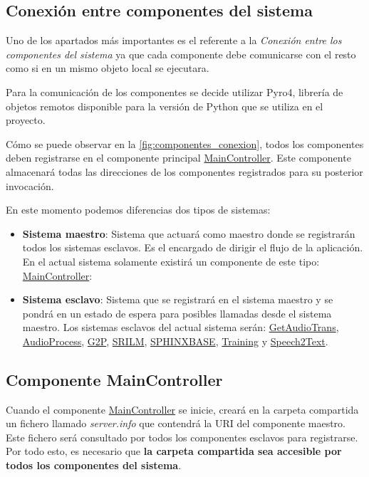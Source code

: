 \documentclass[../main.tex]{subfiles}
\begin{document}
\subsection{Conexión entre componentes del sistema}\label{subsec:impl_conexion}
Uno de los apartados más importantes es el referente a la \textit{Conexión entre los componentes del sistema} ya que cada componente debe comunicarse con el resto como si en un mismo objeto local se ejecutara.

Para la comunicación de los componentes se decide utilizar Pyro4, librería de objetos remotos disponible para la versión de Python que se utiliza en el proyecto.

Cómo se puede observar en la \autoref{fig:componentes_conexion}, todos los componentes deben registrarse en el componente principal \hyperref[par:maincontroller]{MainController}. Este componente almacenará todas las direcciones de los componentes registrados para su posterior invocación.

En este momento podemos diferencias dos tipos de sistemas:
\begin{itemize}
    \item \textbf{Sistema maestro}: Sistema que actuará como maestro donde se registrarán todos los sistemas esclavos. Es el encargado de dirigir el flujo de la aplicación. En el actual sistema solamente existirá un componente de este tipo: \hyperref[par:maincontroller]{MainController}: 
    \item \textbf{Sistema esclavo}: Sistema que se registrará en el sistema maestro y se pondrá en un estado de espera para posibles llamadas desde el sistema maestro. Los sistemas esclavos del actual sistema serán: \hyperref[par:getaudiotrans]{GetAudioTrans}, \hyperref[par:audioprocess]{AudioProcess}, \hyperref[par:g2p]{G2P}, \hyperref[par:srilm]{SRILM}, \hyperref[par:sphinxbase]{SPHINXBASE}, \hyperref[par:training]{Training} y \hyperref[par:speech2text]{Speech2Text}.
\end{itemize}

\subsection{Componente MainController}\label{subsec:impl_maincontroller}
Cuando el componente \hyperref[par:maincontroller]{MainController} se inicie, creará en la carpeta compartida un fichero llamado \textit{server.info} que contendrá la URI del componente maestro. Este fichero será consultado por todos los componentes esclavos para registrarse. Por todo esto, es necesario que \textbf{la carpeta compartida sea accesible por todos los componentes del sistema}.
\end{document}
